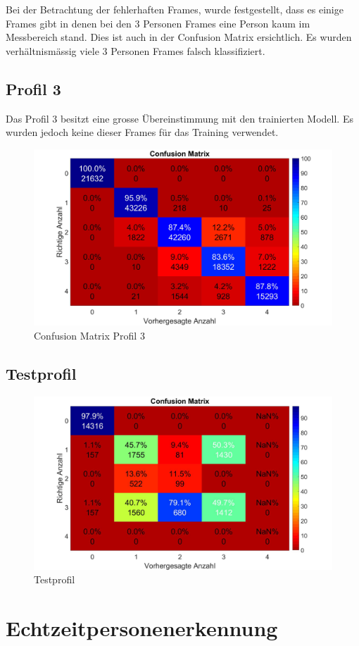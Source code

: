 Bei der Betrachtung der fehlerhaften Frames, wurde festgestellt, dass es einige Frames gibt in denen bei den 3 Personen Frames eine Person kaum im Messbereich stand. Dies ist auch in der Confusion Matrix ersichtlich. Es wurden verhältnismässig viele 3 Personen Frames falsch klassifiziert. 



\subsection{Profil 3}

Das Profil 3 besitzt eine grosse Übereinstimmung mit den trainierten Modell. Es wurden jedoch keine dieser Frames für das Training verwendet.

\begin{figure}[H]
	\centering
	\includegraphics[width=0.5\linewidth]{fig/Profil_3}
		\caption[Confusion Matrix Profil 3]{Confusion Matrix Profil 3}
	\label{fig:profil3}
\end{figure}




\subsection{Testprofil}

\begin{figure}[H]
	\centering
	\includegraphics[width=0.5\linewidth]{fig/Testprofil}
	\caption{Testprofil}
	\label{fig:profil4}
\end{figure}

\section{Echtzeitpersonenerkennung}

